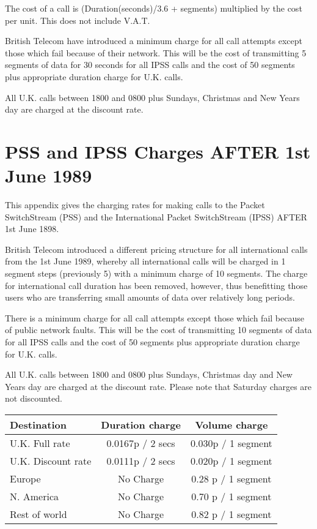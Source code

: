   The cost of a call is (Duration(seconds)/3.6 + segments)  multiplied
  by the cost per unit.  This does not include V.A.T.
 
  British Telecom have introduced a  minimum  charge  for  all  call
  attempts except  those  which  fail  because of their network.  This
  will be the cost of transmitting 5 segments of data for  30  seconds
  for all  IPSS  calls  and  the  cost of 50 segments plus appropriate
  duration charge for U.K.  calls.
 
  All U.K.  calls between 1800 and 0800 plus  Sundays,  Christmas  and
  New Years day are charged at the discount rate.


\newpage

\section {PSS and IPSS Charges AFTER 1st June 1989}

This appendix gives the charging  rates  for  making  calls  to  the Packet
SwitchStream  (PSS) and the International Packet SwitchStream (IPSS) AFTER
1st June 1898.
 
British Telecom  introduced  a  different  pricing  structure  for  all
international calls  from  the 1st June 1989, whereby all international
calls will be charged in 1 segment steps (previously 5) with a  minimum
charge of  10 segments.  The charge for international call duration has
been removed,  however,  thus   benefitting   those   users   who   are
transferring small amounts of data over relatively long periods.
 
There is a minimum charge for all call attempts except those which fail
because of  public  network  faults.   This  will  be   the   cost   of
transmitting 10  segments of data for all IPSS calls and the cost of 50
segments plus appropriate duration charge for U.K.  calls.
 
All U.K.  calls between 1800 and 0800 plus Sundays, Christmas  day  and
New Years  day  are  charged  at  the  discount rate.  Please note that
Saturday charges are not discounted.
 
\begin{table}[h]
\begin{center}
\begin{tabular} {||l|c|c||}
\hline
Destination  &  Duration charge   & Volume charge \\
\hline
U.K. Full rate       &   0.0167p /  2 secs   &    0.030p / 1 segment \\
U.K. Discount rate   &   0.0111p /  2 secs   &    0.020p / 1 segment \\
Europe               &   No Charge           &    0.28 p / 1 segment  \\
N. America           &   No Charge           &    0.70 p / 1 segment  \\
Rest of world        &   No Charge           &    0.82 p / 1 segment   \\
\hline
\end{tabular}
\end{center} 
\end{table}

